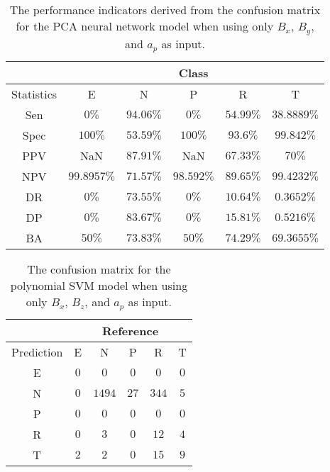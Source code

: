 \begin{table}[!ht]
	\centering
	\begin{tabular}{|c|c|c|c|c|c|}
		\hline
		 & \multicolumn{5}{c|}{Class} \\ \hline
		Statistics & E & N & P & R & T \\ \hline
		Sen & $0\%$ & $94.06\%$ & $0\%$ & $54.99\%$ & $38.8889\%$ \\ \hline
		Spec & $100\%$ & $53.59\%$ & $100\%$ & $93.6\%$ & $99.842\%$ \\ \hline
		PPV & NaN & $87.91\%$ & NaN & $67.33\%$ & $70\%$ \\ \hline
		NPV & $99.8957\%$ & $71.57\%$ & $98.592\%$ & $89.65\%$ & $99.4232\%$ \\ \hline
		DR & $0\%$ & $73.55\%$ & $0\%$ & $10.64\%$ & $0.3652\%$ \\ \hline
		DP & $0\%$ & $83.67\%$ & $0\%$ & $15.81\%$ & $0.5216\%$ \\ \hline
		BA & $50\%$ & $73.83\%$ & $50\%$ & $74.29\%$ & $69.3655\%$ \\ \hline
	\end{tabular}
	\caption{The performance indicators derived from the confusion matrix for the PCA neural network model when using only $B_{x}$, $B_{y}$, and $a_{p}$ as input.}
	\label{tab:cs:reverse:xyap:pcaNNet}
\end{table}

\begin{table}[!ht]
	\centering
	\begin{tabular}{|c|c|c|c|c|c|}
		\hline
		 & \multicolumn{5}{|c|}{Reference} \\ \hline
		 Prediction & E & N & P & R & T \\ \hline
		 E & $0$ & $0$ & $0$ & $0$ & $0$ \\ \hline
		 N & $0$ & $1494$ & $27$ & $344$ & $5$ \\ \hline
		 P & $0$ & $0$ & $0$ & $0$ & $0$ \\ \hline
		 R & $0$ & $3$ & $0$ & $12$ & $4$ \\ \hline
		 T & $2$ & $2$ & $0$ & $15$ & $9$ \\ \hline
	\end{tabular}
	\caption{The confusion matrix for the polynomial SVM model when using only $B_{x}$, $B_{z}$, and $a_{p}$ as input.}
	\label{tab:cm:xzap:svmPoly}
\end{table}

